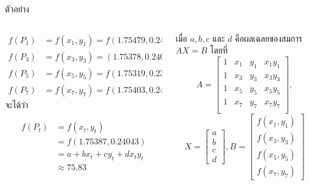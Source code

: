 \documentclass[12pt,aspectratio=169]{beamer}
\begin{document}
\begin{frame}{ตัวอย่าง}
        \begin{columns}
            \begin{column}{0.6\textwidth}
\begin{align*}
f(P_1) & = f(x_1,y_1) = f(1.75479, 0.24063) = 74, \\ 
f(P_3) & = f(x_3,y_3) = (1.75378, 0.24084) = 63,\\
f(P_5) & = f(x_5,y_5) = f(1.75319, 0.23996) = 78,\\
f(P_7) & = f(x_7,y_7) = f(1.75403, 0.24010) = 89, 
\end{align*}
จะได้ว่า
            \begin{block}{}
            \vspace{-3mm}
              \begin{align*}
                 f(P_t) & = f(x_t,y_t) \\
                        & = f(1.75387, 0.24043)\\
                        & = a+bx_t+cy_t+dx_ty_t \\
                        & \approx 75.83
              \end{align*}  
            \end{block}

            \end{column}
            \begin{column}{0.35\textwidth} 

{\color{orange!90!black}%
เมื่อ $a,b,c$ และ $d$ คือผลเฉลยของสมการ $AX = B$  โดยที่              
            \[
               A
               =\begin{bmatrix}
               1 & x_1 & y_1 & x_1y_1\\
               1 & x_3 & y_3 & x_3y_3\\
               1 & x_5 & y_5 & x_5y_5\\
               1 & x_7 & y_7 & x_7y_7\\
               \end{bmatrix},
        \]
        \[
               X = \begin{bmatrix}
                  a \\ b \\ c \\ d
               \end{bmatrix}
               ,
               B
               =\begin{bmatrix}
                  f(x_1,y_1) \\
                  f(x_3,y_3) \\
                  f(x_5,y_5) \\
                  f(x_7,y_7)
               \end{bmatrix}
        \]
}
            \end{column}

            \end{columns}    
\end{frame}
\end{document}
